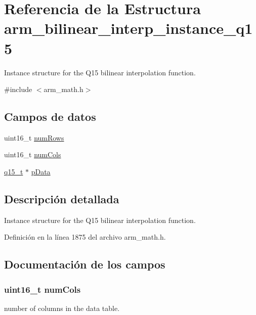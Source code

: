 \hypertarget{structarm__bilinear__interp__instance__q15}{}\section{Referencia de la Estructura arm\+\_\+bilinear\+\_\+interp\+\_\+instance\+\_\+q15}
\label{structarm__bilinear__interp__instance__q15}


Instance structure for the Q15 bilinear interpolation function.  




{\ttfamily \#include $<$arm\+\_\+math.\+h$>$}

\subsection*{Campos de datos}
\begin{DoxyCompactItemize}
\item 
uint16\+\_\+t \hyperlink{structarm__bilinear__interp__instance__q15_a1bcf80ccdc2acc29198f1592ae300390}{num\+Rows}
\item 
uint16\+\_\+t \hyperlink{structarm__bilinear__interp__instance__q15_a4bb5ec0d13eb4c9cf887aa8366a44117}{num\+Cols}
\item 
\hyperlink{arm__math_8h_ab5a8fb21a5b3b983d5f54f31614052ea}{q15\+\_\+t} $\ast$ \hyperlink{structarm__bilinear__interp__instance__q15_a817ede38365e63e561a12069c6c5c087}{p\+Data}
\end{DoxyCompactItemize}


\subsection{Descripción detallada}
Instance structure for the Q15 bilinear interpolation function. 

Definición en la línea 1875 del archivo arm\+\_\+math.\+h.



\subsection{Documentación de los campos}
\subsubsection[{\texorpdfstring{num\+Cols}{numCols}}]{\setlength{\rightskip}{0pt plus 5cm}uint16\+\_\+t num\+Cols}\hypertarget{structarm__bilinear__interp__instance__q15_a4bb5ec0d13eb4c9cf887aa8366a44117}{}\label{structarm__bilinear__interp__instance__q15_a4bb5ec0d13eb4c9cf887aa8366a44117}
number of columns in the data table. 

